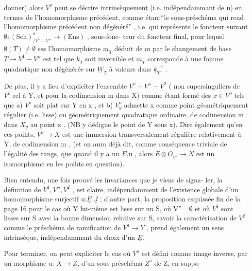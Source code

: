 donner) alors $V^2$ peut se décrire intrinsèquement (i.e. indépendammant de u)
 en termes de l'homomorphisme précédent, comme étant``le sous-préschéma
qui rend l'homomorphisme précédent non dégénéré'' , i.e. qui représente le
foncteur suivant $\emptyset : (\mathrm{Sch})^{o}_{/V^1 - V''} \longrightarrow (\mathrm{Ens})$ , sous-fonc-%
teur du foncteur final, pour lequel $\emptyset(T)\neq \emptyset$ sss l'homomorphisme $\underline{m}_T$ déduit
de $\underline{m}$ par le changement de base $T \to V^1 - V''$ est tel que $\underline{k}_T$ soit inversible et
$\underline{m}_T$ corresponde à une fomme quadratique non dégénérée sur $\underline{W}_T$ à valeurs dans
$\underline{k}_T^{-1}$ .

De plus, il y a lieu  d'expliciter l'ensemble $V^o - V'' - V^2$ 
( non supersinguliers de $V^o$ rel à Y, et pour la codimension m dans X)
comme étant formé des $x \in V^o$ tels que a) $V^o$ soit plat sur Y en x , et
b) $V^o_y$ admette x comme point géométriquement régulier (i.e. lisse) \uline{ou}
géométriquement  quadratique ordinaire, de codimension m dans $X_y$
au point x . (NB y dédigne le point de Y sous x). Dire également qu'en ces
poihts, $V^o \longrightarrow X$ est une immersion transversalement régulière relativement à
Y, de codimension m , (et on aura déjà dit, comme conséquence triviale de
l'égalité des rangs, que quand il y a un $\underline{E}$,u , alors $\underline{E}\otimes\underline{O}_{V^o} \to \underline{N}$ est un
isomorphisme en les poihts en question).

Bien entendu, une fois prouvé les invariances que je viens de signa-%
ler, la définition de $V^1, V'', V^2$ ,  est claire, indépendamment
de l'existence globale d'un homomorphisme surjectif u:$\underline{E}$ \quad $\underline{J}$ ; d'autre part,
la proposition esquissée fin de la page 16 pour le cas où Y lui-même est
lisse sur un S, où V''= $\emptyset$ et où  $V^1$ sont lisses sur S avec la bonne dimension
relative sur S,  savoir la caractérisation de $V^2$ comme le
préschéma de ramification de $V^1 \longrightarrow Y$ , prend également un sens intrinsèque,
indépendammant du choix d'un $\underline{E}$.

Pour terminer, on peut expliciter le cas où $V^o$ est défini comme image
inverse, par un morphisme u: $X \to Z$, d'un sous-préschéma $Z^o$ de Z, en suppo-%
